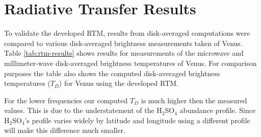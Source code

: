 \section{Radiative Transfer Results}
To validate the developed RTM, results from disk-averaged computations were compared to various disk-averaged brightness measurements taken of Venus. Table \ref{tab:rtm-results} shows results for measurements of the microwave and millimeter-wave disk-averaged brightness temperatures of Venus. For comparison purposes the table also shows the computed disk-averaged brightness temperatures ($T_D$) for Venus using the developed RTM. 

For the lower frequencies our computed $T_D$ is much higher then the measured values. This is due to the understatement of the H$_2$SO$_4$ abundance profile. Since H$_2$SO$_4$'s profile varies widely by latitude and longitude using a different profile will make this difference much smaller. 

